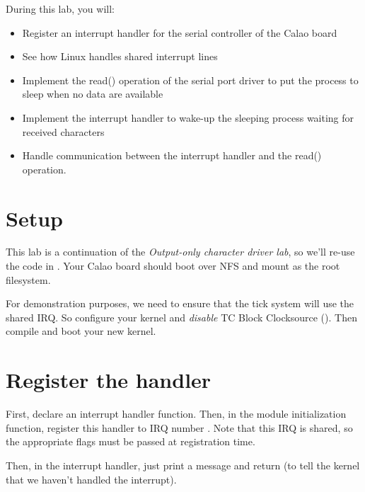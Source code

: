 
During this lab, you will:

\begin{itemize}
\item Register an interrupt handler for the serial controller of the
  Calao board
\item See how Linux handles shared interrupt lines
\item Implement the read() operation of the serial port driver to put
  the process to sleep when no data are available
\item Implement the interrupt handler to wake-up the sleeping process
  waiting for received characters
\item Handle communication between the interrupt handler and the
  read() operation.
\end{itemize}

\section{Setup}

This lab is a continuation of the {\em Output-only character driver
  lab}, so we'll re-use the code in
. Your Calao board should boot over
NFS and mount  as the root
filesystem.

For demonstration purposes, we need to ensure that the tick system will
use the shared IRQ. So configure your kernel and {\em disable} TC
Block Clocksource (). Then compile
and boot your new kernel.

\section{Register the handler}

First, declare an interrupt handler function. Then, in the module
initialization function, register this handler to IRQ number
. Note that this IRQ is shared,
so the appropriate flags must be passed at registration time.

Then, in the interrupt handler, just print a message and
return  (to tell the kernel that we haven't handled
the interrupt).

